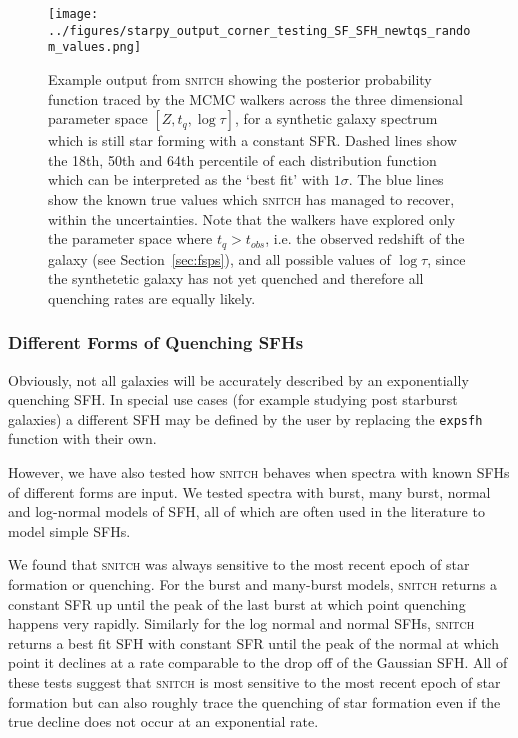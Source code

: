 \documentclass[useAMS,usenatbib]{mn2e}
\begin{document}
\begin{figure}
\centering
\texttt{[image: ../figures/starpy\_output\_corner\_testing\_SF\_SFH\_newtqs\_random\_values.png]}
\caption{Example output from \textsc{snitch} showing the posterior probability function traced by the MCMC walkers across the three dimensional parameter space $[Z,t_q,\log \tau]$, for a synthetic galaxy spectrum which is still star forming with a constant SFR.  Dashed lines show the 18th, 50th and 64th percentile of each distribution function which can be interpreted as the `best fit' with $1\sigma$. The blue lines show the known true values which \textsc{snitch} has managed to recover, within the uncertainties. Note that the walkers have explored only the parameter space where $t_q > t_{obs}$, i.e. the observed redshift of the galaxy (see Section~\ref{sec:fsps}), and all possible values of $\log \tau$, since the synthetetic galaxy has not yet quenched and therefore all quenching rates are equally likely.  }
\label{fig:sfgal}
\end{figure}


\subsubsection{Different Forms of Quenching SFHs}

Obviously, not all galaxies will be accurately described by an exponentially quenching SFH. In special use cases (for example studying post starburst galaxies) a different SFH may be defined by the user by replacing the \texttt{expsfh} function with their own. 

However, we have also tested how \textsc{snitch} behaves when spectra with known SFHs of different forms are input. We tested spectra with burst, many burst, normal and log-normal models of SFH, all of which are often used in the literature to model simple SFHs. 

We found that \textsc{snitch} was always sensitive to the most recent epoch of star formation or quenching. For the burst and many-burst models, \textsc{snitch} returns a constant SFR up until the peak of the last burst at which point quenching happens very rapidly. Similarly for the log normal and normal SFHs, \textsc{snitch} returns a best fit SFH with constant SFR until the peak of the normal at which point it declines at a rate comparable to the drop off of the Gaussian SFH. All of these tests suggest that \textsc{snitch} is most sensitive to the most recent epoch of star formation but can also roughly trace the quenching of star formation even if the true decline does not occur at an exponential rate. 
\end{document}

